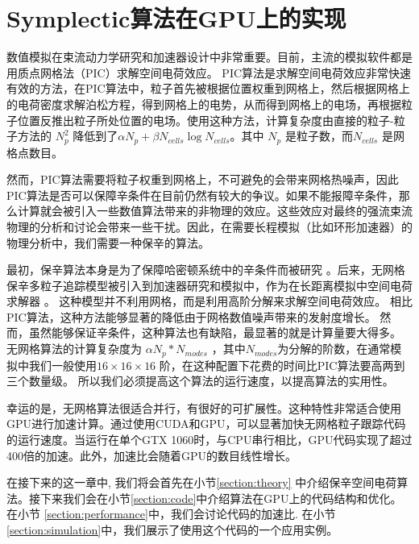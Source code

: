
\chapter{Symplectic算法在GPU上的实现}
\label{chap:symplectic}

数值模拟在束流动力学研究和加速器设计中非常重要。目前，主流的模拟软件都是用质点网格法（PIC）求解空间电荷效应\cite{PIC_Birdsall1991, PIC_friedman1992, PIC_ji2000, PIC_ji2004, PIC_Amundson2006229, PIC_tracewin2014, PIC_beampath2005}。
PIC算法是求解空间电荷效应非常快速有效的方法，在PIC算法中，粒子首先被根据位置权重到网格上，然后根据网格上的电荷密度求解泊松方程，得到网格上的电势，从而得到网格上的电场，再根据粒子位置反推出粒子所处位置的电场。使用这种方法，计算复杂度由直接的粒子-粒子方法的 $N_p^2$ 降低到了$\alpha N_p + \beta N_{cells}\log{N_{cells}}$。其中 $N_p$ 是粒子数，而$N_{cells}$ 是网格点数目。

然而，PIC算法需要将粒子权重到网格上，不可避免的会带来网格热噪声，因此PIC算法是否可以保障辛条件在目前仍然有较大的争议。如果不能报障辛条件，那么计算就会被引入一些数值算法带来的非物理的效应。这些效应对最终的强流束流物理的分析和讨论会带来一些干扰。因此，在需要长程模拟（比如环形加速器）的物理分析中，我们需要一种保辛的算法。

最初，保辛算法本身是为了保障哈密顿系统中的辛条件而被研究 \cite{symplectic_channel1990, symplectic_yoshida1990}。后来，无网格保辛多粒子追踪模型被引入到加速器研究和模拟中，作为在长距离模拟中空间电荷求解器 \cite{symplectic_ji2017}。
这种模型并不利用网格，而是利用高阶分解来求解空间电荷效应。
相比PIC算法，这种方法能够显著的降低由于网格数值噪声带来的发射度增长。
然而，虽然能够保证辛条件，这种算法也有缺陷，最显著的就是计算量要大得多。
无网格算法的计算复杂度为 $\alpha N_p * N_{modes}$ ，其中$N_{modes}$为分解的阶数，在通常模拟中我们一般使用$16 \times 16 \times 16$ 阶，在这种配置下花费的时间比PIC算法要高两到三个数量级。
所以我们必须提高这个算法的运行速度，以提高算法的实用性。

幸运的是，无网格算法很适合并行，有很好的可扩展性。这种特性非常适合使用GPU进行加速计算。通过使用CUDA和GPU，可以显著加快无网格粒子跟踪代码的运行速度。当运行在单个GTX 1060时，与CPU串行相比，GPU代码实现了超过400倍的加速。此外，加速比会随着GPU的数目线性增长。

在接下来的这一章中, 我们将会首先在小节\ref{section:theory} 中介绍保辛空间电荷算法。接下来我们会在小节\ref{section:code}中介绍算法在GPU上的代码结构和优化。在小节 \ref{section:performance}中，我们会讨论代码的加速比. 在小节\ref{section:simulation}中，我们展示了使用这个代码的一个应用实例。

